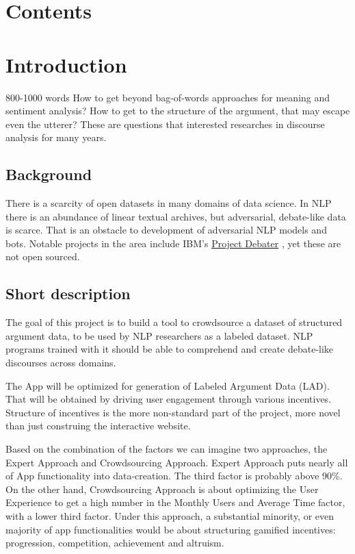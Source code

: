 \documentclass{article}
\begin{document}
\newpage

\section{Contents}
\tableofcontents
\blindtext
\newpage

\section{Introduction} 800-1000 words
How to get beyond bag-of-words approaches for meaning and sentiment analysis? 
How to get to the structure of the argument, that may escape even the utterer?
These are questions that interested researches in discourse analysis for many years.

\subsection{Background}
There is a scarcity of open datasets in many domains of data science. In NLP there is an abundance of linear textual archives, but adversarial, debate-like data is scarce.
That is an obstacle to development of adversarial NLP models and bots. Notable projects in the area include IBM's \href{https://research.ibm.com/interactive/project-debater/}{Project Debater} \cite{slonim2021autonomous}, yet these are not open sourced.

\subsection{Short description}
The goal of this project is to build a tool to crowdsource a dataset of structured argument data, to be used by NLP researchers as a labeled dataset.
NLP programs trained with it should be able to comprehend and create debate-like discourses across domains.

The App will be optimized for generation of Labeled Argument Data (LAD).
That will be obtained by driving user engagement through various incentives. 
Structure of incentives is the more non-standard part of the project, more novel than just construing the interactive website.

Based on the combination of the factors we can imagine two approaches, the Expert Approach and Crowdsourcing Approach. 
Expert Approach puts nearly all of App functionality into data-creation. The third factor is probably above {90\%}.
On the other hand, Crowdsourcing Approach is about optimizing the User Experience to get a high number in the Monthly Users and Average Time factor, with a lower third factor.
Under this approach, a substantial minority, or even majority of app functionalities would be about structuring gamified incentives: progression, competition, achievement and altruism.
\end{document}

